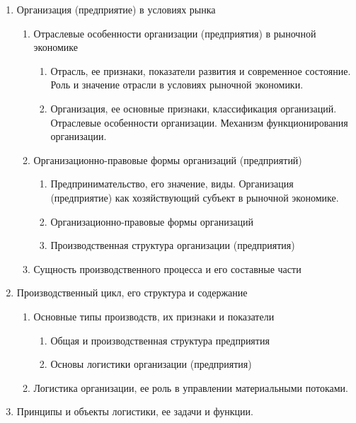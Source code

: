 \documentclass[a4paper,landscape]{article}
\begin{document}
\begin{multicols}{2}
\begin{enumerate}
    \item Организация (предприятие) в условиях рынка
    \begin{enumerate}
        \item Отраслевые особенности организации (предприятия) в рыночной экономике 
        \begin{enumerate}
            \item Отрасль, ее признаки, показатели развития и современное состояние. Роль и значение отрасли в условиях рыночной экономики.
            \item Организация, ее основные признаки, классификация организаций. Отраслевые особенности организации. Механизм функционирования организации.
        \end{enumerate}
        \item Организационно-правовые формы организаций (предприятий)
        \begin{enumerate}
            \item Предпринимательство, его значение, виды. Организация (предприятие) как хозяйствующий субъект в рыночной экономике.
            \item Организационно-правовые формы организаций
            \item Производственная структура организации (предприятия) 
        \end{enumerate}
        \item Сущность производственного процесса и его составные части
    \end{enumerate}
    \item Производственный цикл, его структура и содержание
    \begin{enumerate}
        \item Основные типы производств, их признаки и показатели
        \begin{enumerate}
            \item Общая и производственная структура предприятия
            \item Основы логистики организации (предприятия) 
        \end{enumerate}
        \item Логистика организации, ее роль в управлении материальными потоками.
    \end{enumerate}
    \item Принципы и объекты логистики, ее задачи и функции.
    \begin{enumerate}

\end{enumerate}
\end{enumerate}
\end{multicols}
\end{document}
